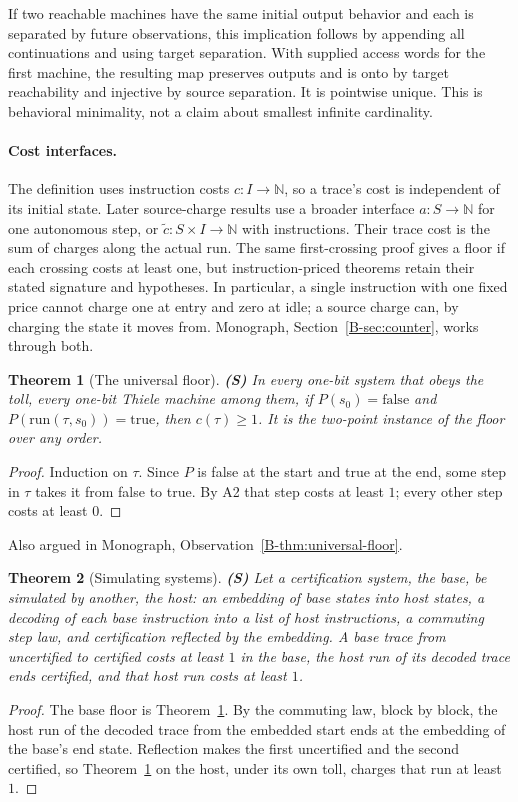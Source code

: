 \documentclass[11pt, a4paper]{report}
\theoremstyle{definition}
\theoremstyle{plain}
\newtheorem{theorem}{Theorem}[chapter]
\newcommand{\N}{\mathbb{N}}
\newcommand{\cost}{c}
\newcommand{\cert}{P}
\begin{document}
If two reachable machines have the same initial output behavior and each is
separated by future observations, this implication follows by appending
all continuations and using target separation. With supplied access words
for the first machine, the resulting map preserves outputs and is onto by
target reachability and injective by source separation. It is pointwise
unique.
This is behavioral minimality, not a claim about smallest infinite cardinality.

\paragraph{Cost interfaces.}
The definition uses instruction costs $\cost:I\to\N$, so a trace's cost is
independent of its initial state. Later source-charge results use a broader
interface $a:S\to\N$ for one autonomous step, or $\widetilde c:S\times I\to\N$
with instructions. Their trace cost is the sum of charges along the actual run.
The same first-crossing proof gives a floor if each crossing costs at least one,
but instruction-priced theorems retain their stated signature and hypotheses.
In particular, a single instruction with one fixed price cannot charge one at
entry and zero at idle; a source charge can, by charging the state it moves from.
Monograph, Section~\ref{B-sec:counter}, works through both.

\begin{theorem}[The universal floor]\label{thm:nfi} \textbf{(S)}
In every one-bit system that obeys the toll, every one-bit Thiele machine among them, if $\cert(s_0) = \mathrm{false}$ and $\cert(\mathrm{run}(\tau, s_0)) = \mathrm{true}$, then $\cost(\tau) \ge 1$.
It is the two-point instance of the floor over any order.
\end{theorem}

\begin{proof}
Induction on $\tau$. Since $\cert$ is false at the start and true at the end, some step in $\tau$ takes it from false to true. By A2 that step costs at least $1$; every other step costs at least $0$.
\end{proof}
\noindent Also argued in Monograph, Observation~\ref{B-thm:universal-floor}.

\begin{theorem}[Simulating systems] \textbf{(S)}
Let a certification system, the base, be simulated by another, the host: an embedding of base states into host states, a decoding of each base instruction into a list of host instructions, a commuting step law, and certification reflected by the embedding. A base trace from uncertified to certified costs at least $1$ in the base, the host run of its decoded trace ends certified, and that host run costs at least $1$.
\end{theorem}
\begin{proof}
The base floor is Theorem~\ref{thm:nfi}. By the commuting law, block by block, the host run of the
decoded trace from the embedded start ends at the embedding of the base's end state. Reflection
makes the first uncertified and the second certified, so Theorem~\ref{thm:nfi} on the host, under
its own toll, charges that run at least $1$.
\end{proof}
\end{document}
